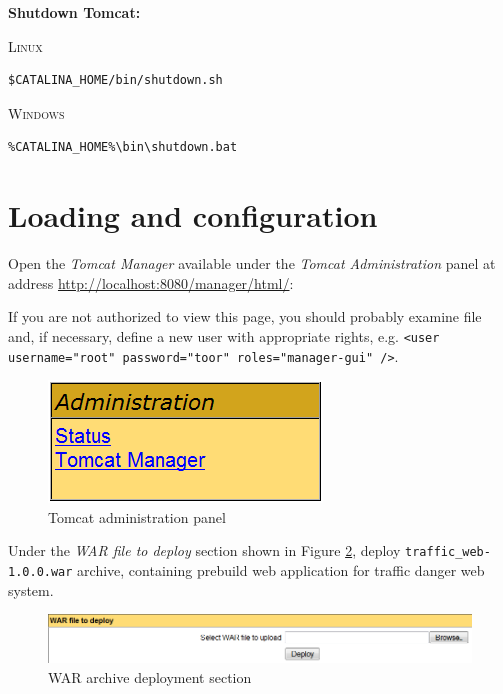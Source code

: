 \bigskip

{\large\textbf{Shutdown Tomcat:}}

\bigskip

{\scshape Linux}
\begin{verbatim}
$CATALINA_HOME/bin/shutdown.sh
\end{verbatim}

{\scshape Windows}
\begin{verbatim}
%CATALINA_HOME%\bin\shutdown.bat
\end{verbatim}

\newpage

\section{Loading and configuration}
\label{sec:loadingAndConfiguration}

Open the \textit{Tomcat Manager} available under the \textit{Tomcat Administration} panel at address \url{http://localhost:8080/manager/html/}:

\begin{framed}
If you are not authorized to view this page, you should probably examine  file and, if necessary, define a new user with appropriate rights, e.g. \texttt{<user username="root" password="toor" roles="manager-gui" />}.
\end{framed}

\begin{figure}[htp]
\centering
\includegraphics[scale=0.6]{images/appendixA/TomcatAdministration}
\caption{Tomcat administration panel}
\label{fig:tomcatAdministrationPanel}
\end{figure}

Under the \textit{WAR file to deploy} section shown in Figure \ref{fig:WARArchiveDeployment}, deploy \texttt{traffic\_web-1.0.0.war} archive, containing prebuild web application for traffic danger web system.

\medskip

\begin{figure}[htp]
\centering
\includegraphics[scale=0.5]{images/appendixA/WARArchiveDeployment}
\caption{WAR archive deployment section}
\label{fig:WARArchiveDeployment}
\end{figure}

